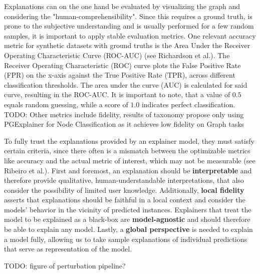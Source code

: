Explanations can on the one hand be evaluated by visualizing the graph and considering the "human-comprehensibility". Since this requires a ground truth, is prone to the subjective understanding and is usually performed for a few random samples, it is important to apply stable evaluation metrics. One relevant accuracy metric for synthetic datasets with ground truths is the Area Under the Receiver Operating Characteristic Curve (ROC-AUC) (see Richardson et al.\cite{RICHARDSON2024100994}). The Receiver Operating Characteristic (ROC) curve plots the False Positive Rate (FPR) on the x-axis against the True Positive Rate (TPR), across different classification thresholds. The area under the curve (AUC) is calculated for said curve, resulting in the ROC-AUC. It is important to note, that a value of $0.5$ equals random guessing, while a score of $1.0$ indicates perfect classification. TODO: Other metrics include fidelity, results of taxonomy propose only using PGExplainer for Node Classification as it achieves low fidelity on Graph tasks

To fully trust the explanations provided by an explainer model, they must satisfy certain criteria, since there often is a mismatch between the optimizable metrics like accuracy and the actual metric of interest, which may not be measurable (see Ribeiro et al.\cite{ribeiro2016should}). First and foremost, an explanation should be \textbf{interpretable} and therefore provide qualitative, human-understandable interpretations, that also consider the possibility of limited user knowledge. Additionally, \textbf{local fidelity} asserts that explanations should be faithful in a local context and consider the models' behavior in the vicinity of predicted instances. Explainers that treat the model to be explained as a black-box are \textbf{model-agnostic} and should therefore be able to explain any model. Lastly, a \textbf{global perspective} is needed to explain a model fully, allowing us to take sample explanations of individual predictions that serve as representation of the model.

TODO: figure of perturbation pipeline?

